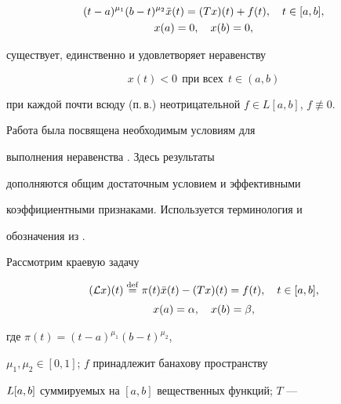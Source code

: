 \begin{gather*}


(t-a)^{\mu_1}(b-t)^{\mu_2}


\Ddot x(t)=(Tx)(t)+f(t),\quad t\in[a,b],\\ x(a)=0,\quad x(b)=0,


\end{gather*}


существует, единственно и удовлетворяет неравенству


\begin{equation}\label{0}




x(t)<0\ \ \text{при всех} \ \ t\in(a,b)




\end{equation}


при каждой почти всюду (п.\,в.) неотрицательной $f\in L[a,b]$, $f\not\equiv0$.





Работа \cite{Br1} была посвящена необходимым условиям для


выполнения неравенства . Здесь результаты


\cite{Br1} дополняются  общим достаточным условием и эффективными


коэффициентными признаками.  Используется терминология и


обозначения из \cite{Br1}.





Рассмотрим краевую задачу


\begin{equation}\label{1}


\begin{array}{c}


(\L x)(t)\eqdef\pi(t)\Ddot x(t)-(Tx)(t)=f(t),\quad t\in[a,b],\\[2mm]


x(a)=\alpha,\quad x(b)=\beta,


\end{array}


\end{equation}


где $\pi(t)=(t-a)^{\mu_1}(b-t)^{\mu_2}$,


$\mu_1,\mu_2\in[0,1]$; $f$ принадлежит банахову  пространству


$L[a,b]$ суммируемых на $[a,b]$ вещественных функций; $T$ ---


